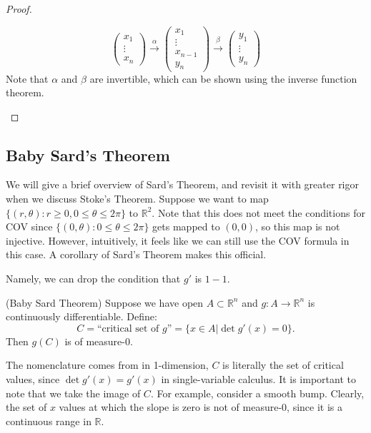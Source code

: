 \documentclass{article}
\numberwithin{equation}{section}
\begin{document}
\begin{proof}
\begin{enumerate}
\begin{equation}
\begin{pmatrix}
                 x_1 \\ \vdots \\ x_n
             \end{pmatrix}
            \xrightarrow[]{\alpha}
            \begin{pmatrix}
                x_1 \\ \vdots \\ x_{n-1} \\ y_n
            \end{pmatrix}
            \xrightarrow[]{\beta}
            \begin{pmatrix}
                y_1 \\ \vdots \\ y_{n}
            \end{pmatrix}
         \end{equation}
         Note that $\alpha$ and $\beta$ are invertible, which can be shown using the inverse function theorem.
    \end{enumerate}
\end{proof}
\subsection{Baby Sard's Theorem}
We will give a brief overview of Sard's Theorem, and revisit it with greater rigor when we discuss Stoke's Theorem. Suppose we want to map $\{(r,\theta): r \ge 0, 0 \le \theta \le 2\pi\}$ to $\mathbb{R}^2.$ Note that this does not meet the conditions for COV since $\{(0,\theta):0\le \theta\le 2\pi\}$ gets mapped to $(0,0)$, so this map is not injective. However, intuitively, it feels like we can still use the COV formula in this case. A corollary of Sard's Theorem makes this official.

Namely, we can drop the condition that $g'$ is $1-1.$
\begin{theorem}
    (Baby Sard Theorem) Suppose we have open $A \subset \mathbb{R}^n$ and $g:A\rightarrow \mathbb{R}^n$ is continuously differentiable. Define:
    \begin{equation}
        C = \text{``critical set of $g$''} = \{x\in A| \det g'(x) = 0\}.
    \end{equation}
    Then $g(C)$ is of measure-$0$.
\end{theorem}
The nomenclature comes from in 1-dimension, $C$ is literally the set of critical values, since $\det g'(x) = g'(x)$ in single-variable calculus. It is important to note that we take the image of $C$. For example, consider a smooth bump. Clearly, the set of $x$ values at which the slope is zero is not of measure-0, since it is a continuous range in $\mathbb{R}.$
\end{document}
